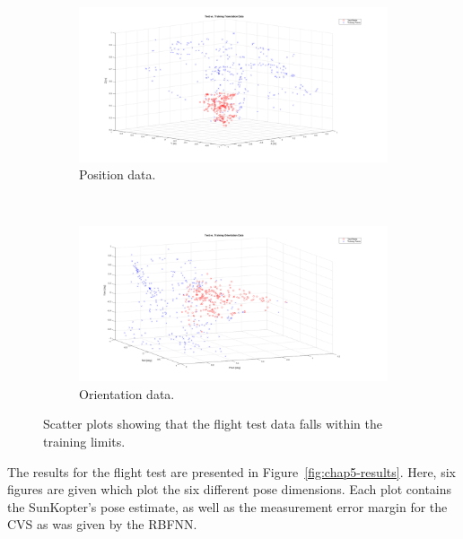 \begin{figure}
  \centering
  \begin{subfigure}{0.9\textwidth}
    \includegraphics[clip, trim = 120 40 120 0, width=\textwidth]{figures/chapter5/ts_v_tr_pos}
    \caption{Position data.}
  \end{subfigure}
  ~
  \begin{subfigure}{0.9\textwidth}
    \includegraphics[clip, trim = 120 40 120 0, width=\textwidth]{figures/chapter5/ts_v_tr_orient}
    \caption{Orientation data.}
  \end{subfigure}
  \caption[Scatter plots of flight data vs. training data. ]{Scatter plots showing that the flight test data falls within the training limits. }
  \label{fig:chap5-ts-tr-scatter}
\end{figure}

The results for the flight test are presented in Figure~\ref{fig:chap5-results}. Here, six figures are given which plot the six different pose dimensions. Each plot contains the SunKopter's pose estimate, as well as the measurement error margin for the CVS as was given by the RBFNN. 
  
